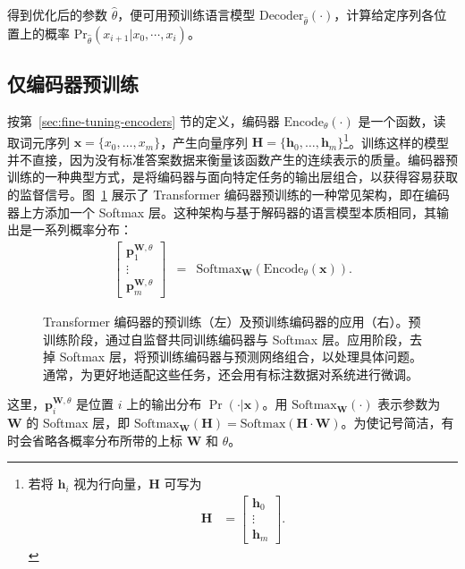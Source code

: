 得到优化后的参数 $\hat{\theta}$，便可用预训练语言模型 $\mathrm{Decoder}_{\hat{\theta}}(\cdot)$，计算给定序列各位置上的概率 $\mathrm{Pr}_{\hat{\theta}}(x_{i+1} | x_0,\cdots,x_i)$。

\subsection{仅编码器预训练}
\label{sec:encoder-only-pre-training}

\noindent 按第~\ref{sec:fine-tuning-encoders} 节的定义，编码器 $\mathrm{Encode}_{\theta}(\cdot)$ 是一个函数，读取词元序列 $\mathbf{x} = \{x_0, \dots, x_m\}$，产生向量序列 $\mathbf{H} = \{\mathbf{h}_0, \dots, \mathbf{h}_m\}$\footnote{若将 $\mathbf{h}_i$ 视为行向量，$\mathbf{H}$ 可写为 \begin{align*}\mathbf{H} & = \begin{bmatrix} \mathbf{h}_0 \\ \vdots \\ \mathbf{h}_m \end{bmatrix}.\end{align*}}。训练这样的模型并不直接，因为没有标准答案数据来衡量该函数产生的连续表示的质量。编码器预训练的一种典型方式，是将编码器与面向特定任务的输出层组合，以获得容易获取的监督信号。图~\ref{fig:pre-training-encoder-architecture} 展示了 Transformer 编码器预训练的一种常见架构，即在编码器上方添加一个 Softmax 层。这种架构与基于解码器的语言模型本质相同，其输出是一系列概率分布：
\begin{eqnarray}
\begin{bmatrix} \mathbf{p}_1^{\mathbf{W},\theta} \\ \vdots \\ \mathbf{p}_m^{\mathbf{W},\theta} \end{bmatrix} & = &  \mathrm{Softmax}_{\mathbf{W}}(\mathrm{Encode}_{\theta}(\mathbf{x})).
\end{eqnarray}

\begin{figure}[!t]
\centering

\caption{Transformer 编码器的预训练（左）及预训练编码器的应用（右）。预训练阶段，通过自监督共同训练编码器与 Softmax 层。应用阶段，去掉 Softmax 层，将预训练编码器与预测网络组合，以处理具体问题。通常，为更好地适配这些任务，还会用有标注数据对系统进行微调。}
\label{fig:pre-training-encoder-architecture}
\end{figure}

\noindent 这里，$\mathbf{p}_i^{\mathbf{W},\theta}$ 是位置 $i$ 上的输出分布 $\Pr(\cdot|\mathbf{x})$。用 $\mathrm{Softmax}_{\mathbf{W}}(\cdot)$ 表示参数为 $\mathbf{W}$ 的 Softmax 层，即 $\mathrm{Softmax}_{\mathbf{W}}(\mathbf{H}) = \mathrm{Softmax}(\mathbf{H} \cdot \mathbf{W})$。为使记号简洁，有时会省略各概率分布所带的上标 $\mathbf{W}$ 和 $\theta$。


